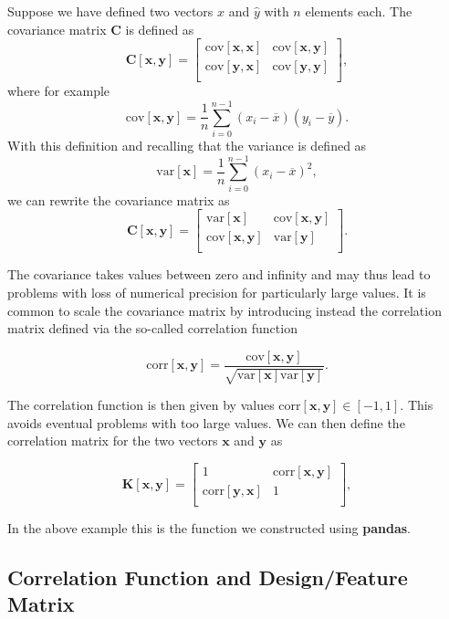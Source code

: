 \documentclass[%
oneside,                 %
final,                   %
10pt]{article}
\begin{document}
Suppose we have defined two vectors
$\hat{x}$ and $\hat{y}$ with $n$ elements each. The covariance matrix $\bm{C}$ is defined as 
\[
\bm{C}[\bm{x},\bm{y}] = \begin{bmatrix} \mathrm{cov}[\bm{x},\bm{x}] & \mathrm{cov}[\bm{x},\bm{y}] \\
                              \mathrm{cov}[\bm{y},\bm{x}] & \mathrm{cov}[\bm{y},\bm{y}] \\
             \end{bmatrix},
\]
where for example
\[
\mathrm{cov}[\bm{x},\bm{y}] =\frac{1}{n} \sum_{i=0}^{n-1}(x_i- \overline{x})(y_i- \overline{y}).
\]
With this definition and recalling that the variance is defined as
\[
\mathrm{var}[\bm{x}]=\frac{1}{n} \sum_{i=0}^{n-1}(x_i- \overline{x})^2,
\]
we can rewrite the covariance matrix as 
\[
\bm{C}[\bm{x},\bm{y}] = \begin{bmatrix} \mathrm{var}[\bm{x}] & \mathrm{cov}[\bm{x},\bm{y}] \\
                              \mathrm{cov}[\bm{x},\bm{y}] & \mathrm{var}[\bm{y}] \\
             \end{bmatrix}.
\]

The covariance takes values between zero and infinity and may thus
lead to problems with loss of numerical precision for particularly
large values. It is common to scale the covariance matrix by
introducing instead the correlation matrix defined via the so-called
correlation function

\[
\mathrm{corr}[\bm{x},\bm{y}]=\frac{\mathrm{cov}[\bm{x},\bm{y}]}{\sqrt{\mathrm{var}[\bm{x}] \mathrm{var}[\bm{y}]}}.
\]

The correlation function is then given by values $\mathrm{corr}[\bm{x},\bm{y}]
\in [-1,1]$. This avoids eventual problems with too large values. We
can then define the correlation matrix for the two vectors $\bm{x}$
and $\bm{y}$ as

\[
\bm{K}[\bm{x},\bm{y}] = \begin{bmatrix} 1 & \mathrm{corr}[\bm{x},\bm{y}] \\
                              \mathrm{corr}[\bm{y},\bm{x}] & 1 \\
             \end{bmatrix},
\]

In the above example this is the function we constructed using \textbf{pandas}.

\subsection{Correlation Function and Design/Feature Matrix}
\end{document}
